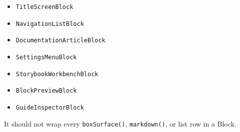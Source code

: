 \begin{itemize}
\tightlist
\item
  \texttt{T\allowbreak{}i\allowbreak{}t\allowbreak{}l\allowbreak{}e\allowbreak{}S\allowbreak{}c\allowbreak{}r\allowbreak{}e\allowbreak{}e\allowbreak{}n\allowbreak{}B\allowbreak{}l\allowbreak{}o\allowbreak{}c\allowbreak{}k}
\item
  \texttt{N\allowbreak{}a\allowbreak{}v\allowbreak{}i\allowbreak{}g\allowbreak{}a\allowbreak{}t\allowbreak{}i\allowbreak{}o\allowbreak{}n\allowbreak{}L\allowbreak{}i\allowbreak{}s\allowbreak{}t\allowbreak{}B\allowbreak{}l\allowbreak{}o\allowbreak{}c\allowbreak{}k}
\item
  \texttt{D\allowbreak{}o\allowbreak{}c\allowbreak{}u\allowbreak{}m\allowbreak{}e\allowbreak{}n\allowbreak{}t\allowbreak{}a\allowbreak{}t\allowbreak{}i\allowbreak{}o\allowbreak{}n\allowbreak{}A\allowbreak{}r\allowbreak{}t\allowbreak{}i\allowbreak{}c\allowbreak{}l\allowbreak{}e\allowbreak{}B\allowbreak{}l\allowbreak{}o\allowbreak{}c\allowbreak{}k}
\item
  \texttt{S\allowbreak{}e\allowbreak{}t\allowbreak{}t\allowbreak{}i\allowbreak{}n\allowbreak{}g\allowbreak{}s\allowbreak{}M\allowbreak{}e\allowbreak{}n\allowbreak{}u\allowbreak{}B\allowbreak{}l\allowbreak{}o\allowbreak{}c\allowbreak{}k}
\item
  \texttt{S\allowbreak{}t\allowbreak{}o\allowbreak{}r\allowbreak{}y\allowbreak{}b\allowbreak{}o\allowbreak{}o\allowbreak{}k\allowbreak{}W\allowbreak{}o\allowbreak{}r\allowbreak{}k\allowbreak{}b\allowbreak{}e\allowbreak{}n\allowbreak{}c\allowbreak{}h\allowbreak{}B\allowbreak{}l\allowbreak{}o\allowbreak{}c\allowbreak{}k}
\item
  \texttt{B\allowbreak{}l\allowbreak{}o\allowbreak{}c\allowbreak{}k\allowbreak{}P\allowbreak{}r\allowbreak{}e\allowbreak{}v\allowbreak{}i\allowbreak{}e\allowbreak{}w\allowbreak{}B\allowbreak{}l\allowbreak{}o\allowbreak{}c\allowbreak{}k}
\item
  \texttt{G\allowbreak{}u\allowbreak{}i\allowbreak{}d\allowbreak{}e\allowbreak{}I\allowbreak{}n\allowbreak{}s\allowbreak{}p\allowbreak{}e\allowbreak{}c\allowbreak{}t\allowbreak{}o\allowbreak{}r\allowbreak{}B\allowbreak{}l\allowbreak{}o\allowbreak{}c\allowbreak{}k}
\end{itemize}

It should not wrap every \texttt{b\allowbreak{}o\allowbreak{}x\allowbreak{}S\allowbreak{}u\allowbreak{}r\allowbreak{}f\allowbreak{}a\allowbreak{}c\allowbreak{}e\allowbreak{}(\allowbreak{})}, \texttt{m\allowbreak{}a\allowbreak{}r\allowbreak{}k\allowbreak{}d\allowbreak{}o\allowbreak{}w\allowbreak{}n\allowbreak{}(\allowbreak{})}, or list row in a Block.

